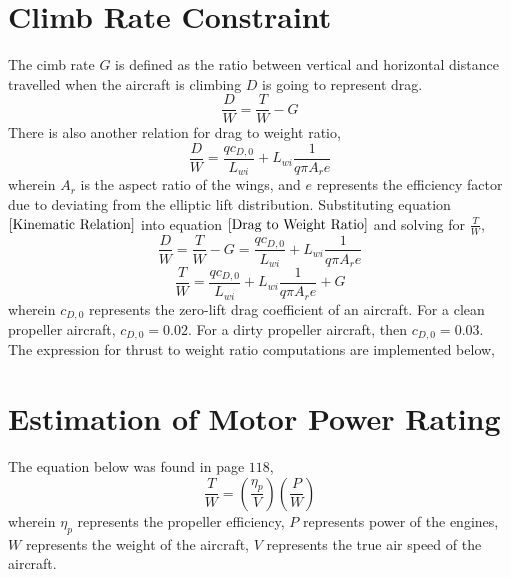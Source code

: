 \documentclass[letter, 12pt]{article}
\begin{document}
\begin{center}
\section{Climb Rate Constraint}
\begin{comment}
\end{comment}
The cimb rate $G$ is defined as the ratio between vertical and horizontal distance travelled when the aircraft is climbing
$D$ is going to represent drag. 
\begin{equation}\frac{D}{W} = \frac{T}{W } - G \label{Kinematic Relation}\end{equation}
There is also another relation for drag to weight ratio,
\begin{equation}\frac{D}{W } = \frac{qc_{D,0}}{L_{wi}} + L_{wi}\frac{1}{q\pi A_{r}e} \label{Drag to Weight Ratio}\end{equation}
wherein $A_{r}$ is the aspect ratio of the wings, and $e$ represents the efficiency factor due to deviating from the elliptic lift distribution.
Substituting equation $\ref{Kinematic Relation}$ into equation $\ref{Drag to Weight Ratio}$ and solving for $\displaystyle\frac{T}{W }$,
$$\frac{D}{W } = \frac{T}{W } - G  = \frac{qc_{D,0}}{L_{wi}} + L_{wi}\frac{1}{q\pi A_{r}e} $$
$$\frac{T}{W }  = \frac{qc_{D,0}}{L_{wi}} + L_{wi}\frac{1}{q\pi A_{r}e} + G $$
wherein $c_{D,0}$ represents the zero-lift drag coefficient of an aircraft. For a clean propeller aircraft, $c_{D,0} = 0.02$. For a dirty propeller aircraft, then $c_{D,0} = 0.03$.
The expression for thrust to weight ratio computations are implemented below,




\section{Estimation of Motor Power Rating}
\begin{comment}
\end{comment}
The equation below was found in page $118$,
$$\frac{T}{W} = \left(\frac{\eta_{p}}{V}\right)\left(\frac{P}{W}\right)$$
wherein $\eta_{p}$ represents the propeller efficiency, 
$P$ represents power of the engines, $W$ represents the weight of the aircraft,
$V$ represents the true air speed of the aircraft.



\end{center}
\end{document}

